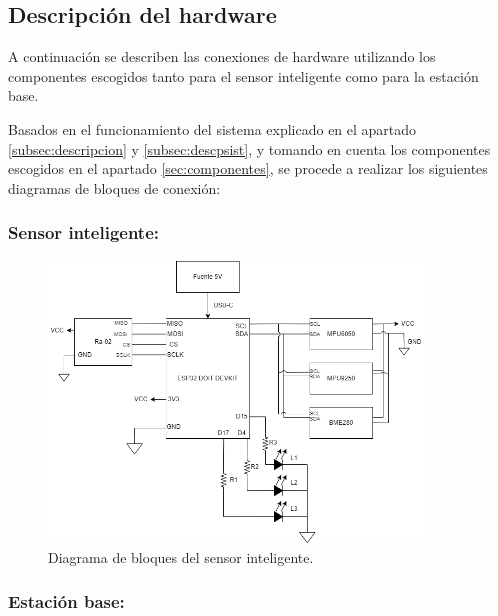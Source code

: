 \subsection{Descripción del hardware}

A continuación se describen las conexiones de hardware utilizando los componentes escogidos tanto para el sensor inteligente como para la estación base.

Basados en el funcionamiento del sistema explicado en el apartado \ref{subsec:descripcion} y \ref{subsec:descpsist}, y tomando en cuenta los componentes escogidos en el apartado \ref{sec:componentes}, se procede a realizar los siguientes diagramas de bloques de conexión: 

\subsubsection{Sensor inteligente:}

\begin{figure}[H]
    \centering
    \includegraphics[width = 0.9\textwidth]{imagenes/cap2_marcometod/DiagramaHardwareSmartSensor.png}
    \caption{Diagrama de bloques del sensor inteligente.}
    \label{fig:smartsensorbloques}
\end{figure}

\subsubsection{Estación base:}

